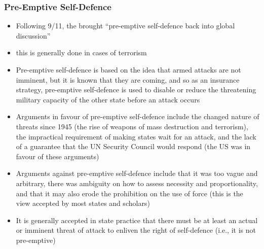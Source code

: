 \subsubsection{Pre-Emptive Self-Defence}
\begin{itemize}
    \item Following 9/11, the  brought  ``pre-emptive self-defence back into global discussion''
    \item this is generally done in cases of terrorism
    \item Pre-emptive self-defence is based on the idea that armed attacks are not imminent, but it is known that they are coming, and so as an insurance strategy, pre-emptive self-defence is used to disable or reduce the threatening military capacity of the other state before an attack occurs
    \item Arguments in favour of pre-emptive self-defence include the changed nature of threats since 1945 (the rise of weapons of mass destruction and terrorism), the impractical requirement of making states wait for an attack, and the lack of a guarantee that the UN Security Council would respond (the US was in favour of these arguments)
    \item Arguments against pre-emptive self-defence include that it was too vague and arbitrary, there was ambiguity on how to assess necessity and proportionality, and that it may also erode the prohibition on the use of force (this is the view accepted by most states and scholars)
    \item It is generally accepted in state practice that there must be at least an actual or imminent threat of attack to enliven the right of self-defence (i.e., it is not pre-emptive)
\end{itemize}

